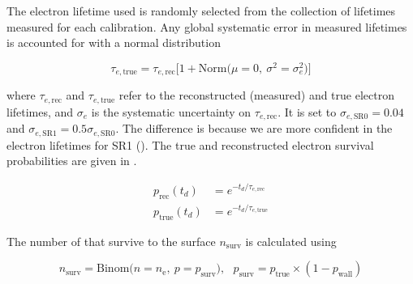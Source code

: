 The electron lifetime used is randomly selected from the collection of lifetimes measured for each calibration.  Any global
systematic error in measured lifetimes  is accounted for with a normal distribution

\vspace{-10pt}

\begin{equation}
\tau_{e, \mathrm{true}} = \tau_{e, \mathrm{rec}} \Big[ 1 + \mathrm{Norm} \big( \mu = 0,\ \sigma^2 = \sigma_{e}^2 \big) \Big]
\label{eq:er_nr_calibrations_parameter_determ_det_phys_elife_true}
\end{equation}

\noindent where $\tau_{e, \mathrm{rec}}$ and $\tau_{e, \mathrm{true}}$ refer to the reconstructed (measured) and true electron
lifetimes, and $\sigma_e$ is the systematic uncertainty on $\tau_{e, \mathrm{rec}}$.  It is set to
$\sigma_{e, \mathrm{SR0}} = 0.04$ and $\sigma_{e, \mathrm{SR1}} = 0.5 \sigma_{e, \mathrm{SR0}}$.  The difference is because we are
more confident in the electron lifetimes for SR1 ().  The true and reconstructed electron
survival probabilities are given in .

\vspace{-20pt}

\begin{subequations}
\begin{align}
p_{\mathrm{rec}} (t_d) &= e^{-t_d / \tau_{e, \mathrm{rec}}} \\
p_{\mathrm{true}} (t_d) &= e^{-t_d / \tau_{e, \mathrm{true}}}
\end{align}
\label{eq:er_nr_calibrations_parameter_determ_det_phys_prob_elifetime}
\end{subequations}

\vspace{-30pt}

The number of \electron that survive to the surface $n_{\mathrm{surv}}$ is calculated using

\vspace{-10pt}

\begin{equation}
n_{\mathrm{surv}} = \mathrm{Binom} \Big( n = n_{\mathrm{e}},\ p = p_{\mathrm{surv}} \Big) ,\ \ \
p_{\mathrm{surv}} = p_{\mathrm{true}} \times (1 - p_{\mathrm{wall}})
\label{eq:er_nr_calibrations_parameter_determ_det_phys_drift_electrons}
\end{equation}

